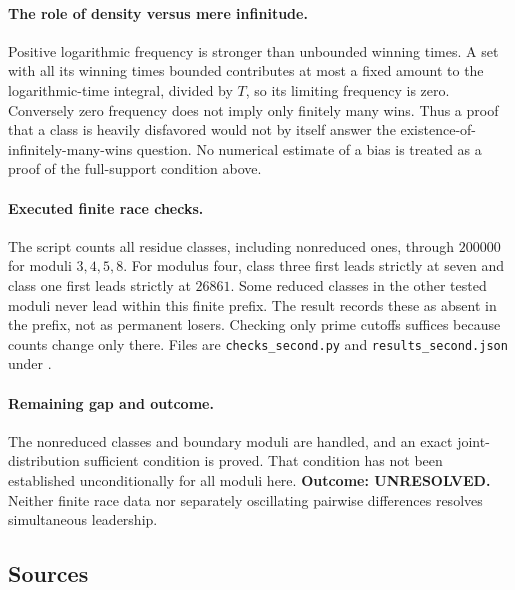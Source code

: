 \documentclass[11pt,a4paper]{article}
\begin{document}
\paragraph{The role of density versus mere infinitude.}
Positive logarithmic frequency is stronger than unbounded winning
times. A set with all its winning times bounded contributes at most a
fixed amount to the logarithmic-time integral, divided by $T$, so its
limiting frequency is zero. Conversely zero frequency does not imply
only finitely many wins. Thus a proof that a class is heavily disfavored
would not by itself answer the existence-of-infinitely-many-wins question.
No numerical estimate of a bias is treated as a proof of the full-support
condition above.

\paragraph{Executed finite race checks.}
The script counts all residue classes, including nonreduced ones,
through $200000$ for moduli $3,4,5,8$. For modulus four, class three
first leads strictly at seven and class one first leads strictly at
$26861$. Some reduced classes in the other tested moduli never lead
within this finite prefix. The result records these as absent in the
prefix, not as permanent losers. Checking only prime cutoffs suffices
because counts change only there. Files are \texttt{checks\_second.py}
and \texttt{results\_second.json} under
.

\paragraph{Remaining gap and outcome.}
The nonreduced classes and boundary moduli are handled, and an exact
joint-distribution sufficient condition is proved. That condition has
not been established unconditionally for all moduli here.
\textbf{Outcome: UNRESOLVED.} Neither finite race data nor separately
oscillating pairwise differences resolves simultaneous leadership.

\subsection{Sources}
\end{document}
